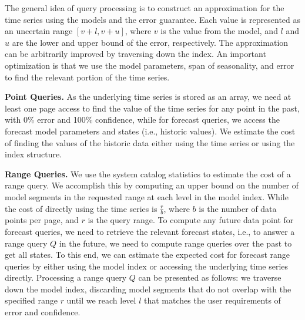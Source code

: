 \documentclass[10pt,conference,letterpaper]{IEEEtran}
\begin{document}
The general idea of query processing is to construct an approximation for the time series using the models and the error guarantee. Each value is represented as an 
uncertain range $[v+l,v+u]$, where $v$ is the value from the model, and $l$ and $u$ are the lower and upper bound of the error, respectively.
The approximation can be arbitrarily improved by traversing down the index. An important optimization is that we use the model parameters, span of seasonality, and error to find the relevant portion of the time series. %

{\bf Point Queries.}
As the underlying time series is stored as an array, we need at least one page access to find the value of the time series for any point in the past, with 0\% error and 100\% confidence,  
while for forecast queries, we access the forecast model parameters and states (i.e., historic values). We estimate the cost of finding the values of the historic data either using the time series or using the index structure.
 
 {\bf Range Queries.}
 We use the system catalog statistics to estimate the cost of a range query. We accomplish this by computing an upper bound on the number of model segments in the requested range 
at each level in the model index. While the cost of directly using the time series is  $\frac{r}{b}$, where $b$ is the number of data points per page, and $r$ is the query range.
To compute any future data point for forecast queries,  we need to retrieve the relevant forecast states, i.e., to answer a range query $Q$ in the future, we need to compute range queries over the past to get all states. To this end, we can estimate the expected cost for forecast range queries by either  using the model index  or accessing the underlying time series directly. 
Processing a  range query $Q$ can be presented as follows: we traverse down the  model index, discarding  model segments that do not overlap with the specified range $r$ until we reach level $l$ that matches the user requirements of error and confidence.
\end{document}
